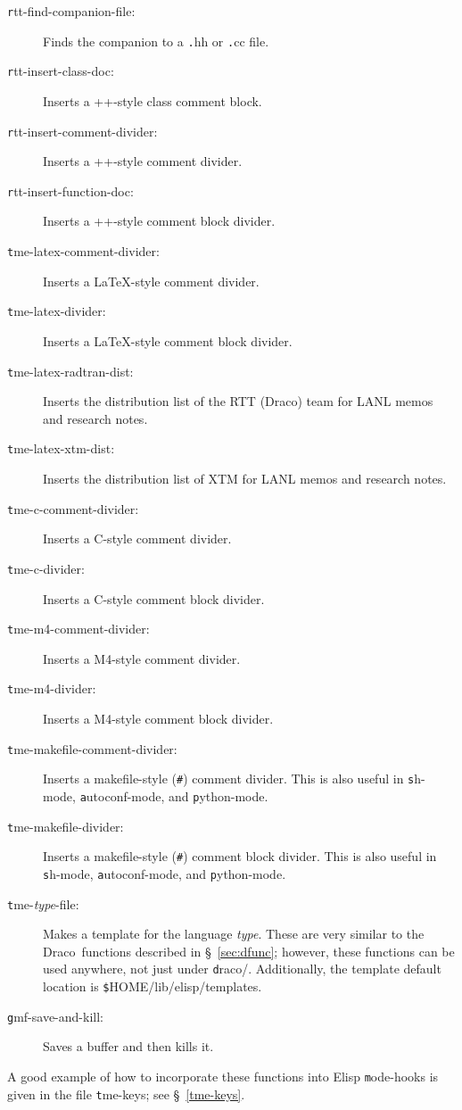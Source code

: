 \documentclass[11pt]{nmemo}
\newcommand{\comp}[1]{{\normalfont\texttt#1}}
\newcommand{\draco}{{\normalfont\sffamily Draco}}
\begin{document}
\begin{description}
\item[\comp{rtt-find-companion-file}:] Finds the companion to a
  \comp{.hh} or \comp{.cc} file.
\item[\comp{rtt-insert-class-doc}:] Inserts a \C++-style class comment 
  block.
\item[\comp{rtt-insert-comment-divider}:] Inserts a \C++-style comment 
  divider.
\item[\comp{rtt-insert-function-doc}:] Inserts a \C++-style comment
  block divider.
\item[\comp{tme-latex-comment-divider}:] Inserts a \LaTeX-style comment
  divider.
\item[\comp{tme-latex-divider}:] Inserts a \LaTeX-style comment block 
  divider.
\item[\comp{tme-latex-radtran-dist}:] Inserts the distribution list of 
  the RTT (\draco) team for LANL memos and research notes.
\item[\comp{tme-latex-xtm-dist}:] Inserts the distribution list of XTM 
  for LANL memos and research notes.
\item[\comp{tme-c-comment-divider}:] Inserts a C-style comment
  divider.
\item[\comp{tme-c-divider}:] Inserts a C-style comment block divider.
\item[\comp{tme-m4-comment-divider}:] Inserts a M4-style comment
  divider.
\item[\comp{tme-m4-divider}:] Inserts a M4-style comment block
  divider.
\item[\comp{tme-makefile-comment-divider}:] Inserts a makefile-style
  (\comp{\#}) comment divider.  This is also useful in \comp{sh-mode},
  \comp{autoconf-mode}, and \comp{python-mode}.
\item[\comp{tme-makefile-divider}:] Inserts a makefile-style
  (\comp{\#}) comment block divider. This is also useful in
  \comp{sh-mode}, \comp{autoconf-mode}, and \comp{python-mode}.
\item[\comp{tme-\textsl{type}-file}:] Makes a template for the
  language \textsl{type}.  These are very similar to the \draco\ 
  functions described in \S~\ref{sec:dfunc}; however, these functions
  can be used anywhere, not just under \comp{draco/}.  Additionally,
  the template default location is \comp{\$HOME/lib/elisp/templates}.
\item[\comp{gmf-save-and-kill}:]  Saves a buffer and then kills it.
\end{description}  
A good example of how to incorporate these functions into Elisp
\comp{mode-hooks} is given in the file \comp{tme-keys}; see
\S~\ref{tme-keys}.
\end{document}
